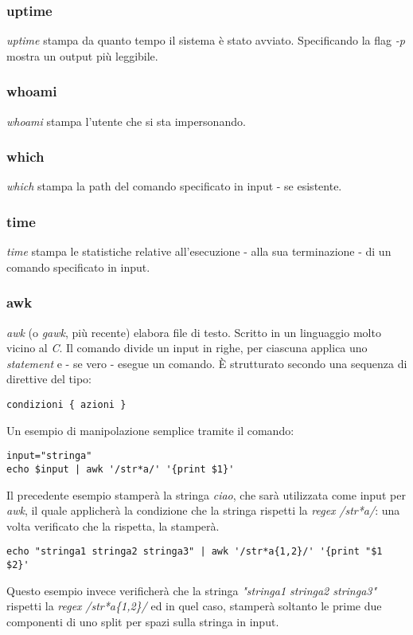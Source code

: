 \subsubsection{uptime}
\textit{uptime} stampa da quanto tempo il sistema è stato avviato. Specificando la flag \textit{-p} mostra un output più leggibile.

\subsubsection{whoami}
\textit{whoami} stampa l'utente che si sta impersonando.

\subsubsection{which}
\textit{which} stampa la path del comando specificato in input - se esistente.

\subsubsection{time}
\textit{time} stampa le statistiche relative all'esecuzione - alla sua terminazione - di un comando specificato in input.

\subsubsection{awk}
\textit{awk} (o \textit{gawk}, più recente) elabora file di testo. Scritto in un linguaggio molto vicino al \textit{C}. Il comando divide un input in righe, per ciascuna applica uno \textit{statement} e - se vero - esegue un comando. È strutturato secondo una sequenza di direttive del tipo:
\begin{lstlisting}
condizioni { azioni }
\end{lstlisting}
Un esempio di manipolazione semplice tramite il comando:
\begin{lstlisting}
input="stringa"
echo $input | awk '/str*a/' '{print $1}'
\end{lstlisting}
Il precedente esempio stamperà la stringa \textit{ciao}, che sarà utilizzata come input per \textit{awk}, il quale applicherà la condizione che la stringa rispetti la \textit{regex} \textit{/str*a/}: una volta verificato che la rispetta, la stamperà.
\begin{lstlisting}
echo "stringa1 stringa2 stringa3" | awk '/str*a{1,2}/' '{print "$1 $2}'
\end{lstlisting}
Questo esempio invece verificherà che la stringa \textit{"stringa1 stringa2 stringa3"} rispetti la \textit{regex} \textit{/str*a\{1,2\}/} ed in quel caso, stamperà soltanto le prime due componenti di uno split per spazi sulla stringa in input.